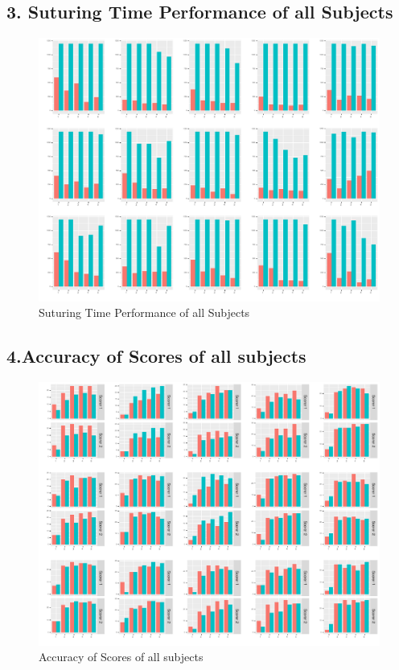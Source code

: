 \documentclass[12pt,epsf]{report}
\begin{document}
{\subsection*{3. Suturing Time Performance of all Subjects}
\begin{figure}[!htb]
	\centering
	\includegraphics[width=1.0\textwidth]{multiplot_task_time.pdf}
	\caption{ Suturing Time Performance of all Subjects}
	\centering
\end{figure}
\FloatBarrier
\subsection*{4.Accuracy of Scores of all subjects}
\begin{figure}[!htb]
	\centering
	\includegraphics[width=1.0\textwidth]{multiplot_scorer.pdf}
	\caption{Accuracy of Scores of all subjects}
	\centering
\end{figure}
\FloatBarrier
}
\end{document}
